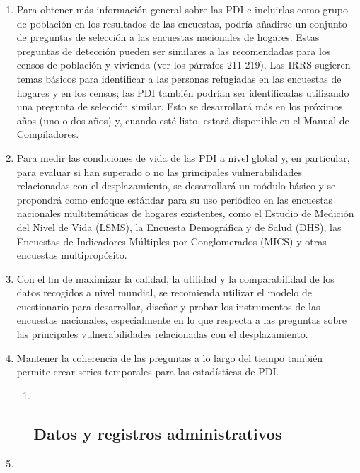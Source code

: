 \documentclass[
]{book}
\begin{document}
\begin{enumerate}
\item
  Para obtener más información general sobre las PDI e incluirlas como grupo de población en los resultados de las encuestas, podría añadirse un conjunto de preguntas de selección a las encuestas nacionales de hogares. Estas preguntas de detección pueden ser similares a las recomendadas para los censos de población y vivienda (ver los párrafos 211-219). Las IRRS sugieren temas básicos para identificar a las personas refugiadas en las encuestas de hogares y en los censos; las PDI también podrían ser identificadas utilizando una pregunta de selección similar. Esto se desarrollará más en los próximos años (uno o dos años) y, cuando esté listo, estará disponible en el Manual de Compiladores.
\item
  Para medir las condiciones de vida de las PDI a nivel global y, en particular, para evaluar si han superado o no las principales vulnerabilidades relacionadas con el desplazamiento, se desarrollará un módulo básico y se propondrá como enfoque estándar para su uso periódico en las encuestas nacionales multitemáticas de hogares existentes, como el Estudio de Medición del Nivel de Vida (LSMS), la Encuesta Demográfica y de Salud (DHS), las Encuestas de Indicadores Múltiples por Conglomerados (MICS) y otras encuestas multipropósito.
\item
  Con el fin de maximizar la calidad, la utilidad y la comparabilidad de los datos recogidos a nivel mundial, se recomienda utilizar el modelo de cuestionario para desarrollar, diseñar y probar los instrumentos de las encuestas nacionales, especialmente en lo que respecta a las preguntas sobre las principales vulnerabilidades relacionadas con el desplazamiento.
\item
  Mantener la coherencia de las preguntas a lo largo del tiempo también permite crear series temporales para las estadísticas de PDI.

  \begin{enumerate}
  \def\labelenumii{\arabic{enumii}.}
  \item ~
    \hypertarget{datos-y-registros-administrativos}{%
    \subsection{Datos y registros administrativos}\label{datos-y-registros-administrativos}}
  \end{enumerate}
\item ~
  \hypertarget{introducciuxf3n-7}{%
}
\end{enumerate}
\end{document}
